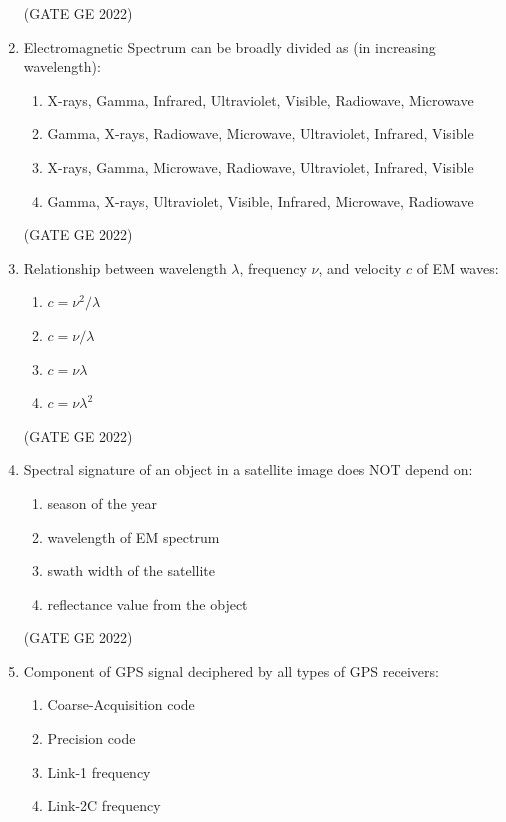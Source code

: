 \documentclass[a4paper, 11pt]{article}
\begin{document}
\begin{enumerate}
\hfill (GATE GE 2022)

\item Electromagnetic Spectrum can be broadly divided as (in increasing wavelength):
\begin{enumerate}
    \item X-rays, Gamma, Infrared, Ultraviolet, Visible, Radiowave, Microwave
    \item Gamma, X-rays, Radiowave, Microwave, Ultraviolet, Infrared, Visible
    \item X-rays, Gamma, Microwave, Radiowave, Ultraviolet, Infrared, Visible
    \item Gamma, X-rays, Ultraviolet, Visible, Infrared, Microwave, Radiowave
\end{enumerate}

\hfill (GATE GE 2022)

\item Relationship between wavelength $\lambda$, frequency $\nu$, and velocity $c$ of EM waves:
\begin{enumerate}
    \item $c = \nu^2 / \lambda$
    \item $c = \nu / \lambda$
    \item $c = \nu \lambda$
    \item $c = \nu \lambda^2$
\end{enumerate}

\hfill (GATE GE 2022)

\item Spectral signature of an object in a satellite image does NOT depend on:
\begin{enumerate}
    \item season of the year
    \item wavelength of EM spectrum
    \item swath width of the satellite
    \item reflectance value from the object
\end{enumerate}

\hfill (GATE GE 2022)

\item Component of GPS signal deciphered by all types of GPS receivers:
\begin{enumerate}
    \item Coarse-Acquisition code
    \item Precision code
    \item Link-1 frequency
    \item Link-2C frequency
\end{enumerate}


\end{enumerate}
\end{document}
